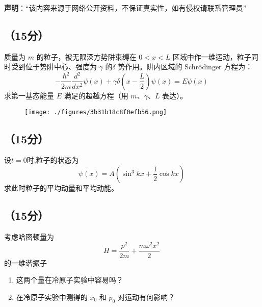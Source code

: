 
\textbf{声明}：“该内容来源于网络公开资料，不保证真实性，如有侵权请联系管理员”

\subsection{（15分）}
质量为 $m$ 的粒子，被无限深方势阱束缚在 $0 < x < L$ 区域中作一维运动，粒子同时受到位于势阱中心、强度为 $\gamma$ 的$\delta$ 势作用。阱内区域的 Schrödinger 方程为：
\[
-\frac{\hbar^2}{2m}\frac{d^2 }{dx^2}\psi(x) + \gamma \delta \left(x - \frac{L}{2}\right)\psi(x) = E \psi(x)~
\]
求第一基态能量 $E$ 满足的超越方程（用 $m$、$\gamma$、$L$ 表达）。
\begin{figure}[ht]
\centering
\texttt{[image: ./figures/3b31b18c8f0efb56.png]}
\caption{} \label{fig_SEU01_1}
\end{figure}

\subsection{（15分）}
设$t=0$时,粒子的状态为
 \[\psi(x) = A \left( \sin^3 kx + \frac{1}{2} \cos kx \right)~\]
求此时粒子的平均动量和平均动能。

\subsection{（15分）}
考虑哈密顿量为 
\[H = \frac{p^2}{2m} + \frac{m \omega^2 x^2}{2}~\]
的一维谐振子
\begin{enumerate}
    “初始位置”  和“初始动量” 的算子：
    \[
    x_0 = x \cos \omega t - \frac{p}{m \omega} \sin \omega t~
    \]
    \[
    p_0 = p \cos \omega t + m \omega x \sin \omega t~
    \]
    的期待值对时间的依赖关系。
    \item  这两个量在冷原子实验中容易吗？
    \item  在冷原子实验中测得的 $x_0$ 和 $p_0$ 对运动有何影响？
\end{enumerate}